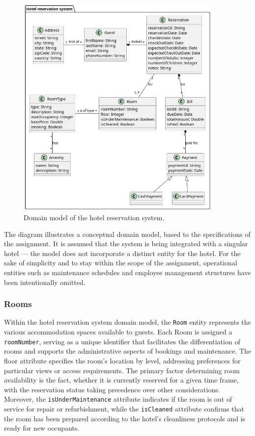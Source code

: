 \begin{figure}[h]
\centering
\includegraphics[width=0.9\textwidth]{images/domain-model.png}
\caption{\label{fig:domain-model} Domain model of the hotel reservation system.}
\end{figure}

The diagram illustrates a conceptual domain model, based to the specifications of the assignment. It is assumed that the system is being integrated with a singular hotel --- the model does not incorporate a distinct entity for the hotel. For the sake of simplicity and to stay within the scope of the assignment, operational entities such as maintenance schedules and employee management structures have been intentionally omitted.

\pagebreak

\subsubsection{Rooms}

Within the hotel reservation system domain model, the \texttt{Room} entity represents the various accommodation spaces available to guests. Each Room is assigned a \texttt{roomNumber}, serving as a unique identifier that facilitates the differentiation of rooms and supports the administrative aspects of bookings and maintenance. The floor attribute specifies the room's location by level, addressing preferences for particular views or access requirements. The primary factor determining room availability is the fact, whether it is currently reserved for a given time frame, with the reservation status taking precedence over other considerations. Moreover, the \texttt{isUnderMaintenance} attribute indicates if the room is out of service for repair or refurbishment, while the \texttt{isCleaned} attribute confirms that the room has been prepared according to the hotel's cleanliness protocols and is ready for new occupants.

